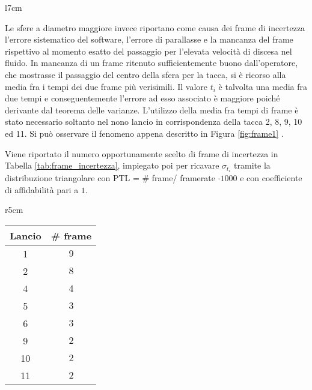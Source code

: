 \documentclass[a4paper,11pt,oneside]{article}
\begin{document}
\begin{wrapfigure}{l}{7cm} %
    \centering
    \caption{Esempio di frame consecutivi, \\ lancio 8, tacca 11}
\end{wrapfigure}
Le sfere a diametro maggiore invece riportano come causa dei frame di incertezza l'errore sistematico del software, l'errore di parallasse e la mancanza del frame rispettivo al momento esatto del passaggio per l'elevata velocità di discesa nel fluido.
In mancanza di un frame ritenuto sufficientemente buono dall'operatore, che mostrasse il passaggio del centro della sfera per la tacca, si è ricorso alla media fra i tempi dei due frame più verisimili. Il valore $t_i$ è talvolta una media fra due tempi e conseguentemente l'errore ad esso associato è maggiore poiché derivante dal teorema delle varianze. L'utilizzo della media fra tempi di frame è stato necessario soltanto nel nono lancio in corrispondenza della tacca 2, 8, 9, 10 ed 11. Si può osservare il fenomeno appena descritto in Figura \ref{fig:frame1} .

Viene riportato il numero opportunamente scelto di frame di incertezza in Tabella \ref{tab:frame_incertezza}, impiegato poi per ricavare $\sigma_{t_{i}}$ tramite la distribuzione triangolare con PTL = \# frame/ framerate $\cdot 1000$ e con coefficiente di affidabilità pari a $1$.\newline


\begin{wraptable}{r}{5cm}
\centering
\caption{Frame di incertezza}
\label{tab:frame_incertezza}
\begin{tabular}{|c|c|}
\hline
Lancio & \# frame  \\ \hline
{\rowcolor[rgb]{0.85,0.85,0.85}}1      & $9$ \\ \hline
2      & $8$ \\ \hline
{\rowcolor[rgb]{0.85,0.85,0.85}}4      & $4$ \\ \hline
5      & $3$ \\ \hline
{\rowcolor[rgb]{0.85,0.85,0.85}}6      & $3$ \\ \hline
9      & $2$ \\ \hline
{\rowcolor[rgb]{0.85,0.85,0.85}}10     & $2$ \\ \hline
11     & $2$ \\ \hline
\end{tabular}
\end{wraptable}
\end{document}
